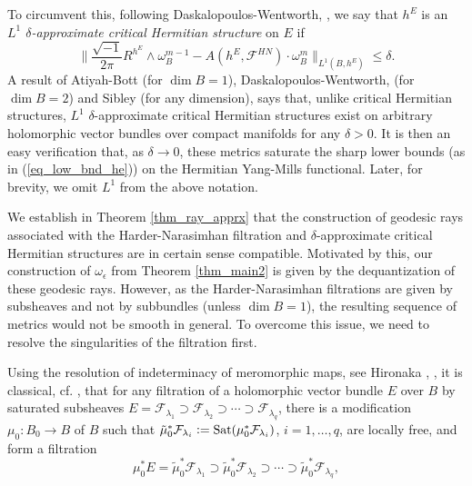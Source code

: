 \documentclass[12pt]{article}
\numberwithin{equation}{section}
\theoremstyle{theorem}
\theoremstyle{definition}
\theoremstyle{remark}
\newcommand{\imun} {\sqrt{-1}}
\begin{document}
	\begin{sloppypar}
	To circumvent this, following Daskalopoulos-Wentworth, \cite{DaskWent}, we say that $h^E$ is an \textit{$L^1$ $\delta$-approximate critical Hermitian structure} on $E$ if
	\begin{equation}\label{eq_appr_crhs}
		\Big\|
			\frac{\imun}{2 \pi} R^{h^E} \wedge \omega_B^{m - 1}
			-
			A(h^E, \mathcal{F}^{HN}) \cdot \omega_B^m
		\Big\|_{L^1(B, h^E)}
		\leq
		\delta.
	\end{equation}
	A result of Atiyah-Bott \cite[proof of Proposition 8.20]{AtiyahBott} (for $\dim B = 1$), Daskalopoulos-Wentworth, \cite[Theorem 3.11]{DaskWent} (for $\dim B = 2$) and Sibley \cite[Theorem 1.3]{SibleyYangMills} (for any dimension), says that, unlike critical Hermitian structures, $L^1$ $\delta$-approximate critical Hermitian structures exist on arbitrary holomorphic vector bundles over compact manifolds for any $\delta > 0$.
	It is then an easy verification that, as $\delta \to 0$, these metrics saturate the sharp lower bounds (as in (\ref{eq_low_bnd_he})) on the Hermitian Yang-Mills functional.
	Later, for brevity, we omit $L^1$ from the above notation.
	\end{sloppypar}
	\par 
	We establish in Theorem \ref{thm_ray_apprx} that the construction of geodesic rays associated with the Harder-Narasimhan filtration and $\delta$-approximate critical Hermitian structures are in certain sense compatible. 
	Motivated by this, our construction of $\omega_{\epsilon}$ from Theorem \ref{thm_main2} is given by the dequantization of these geodesic rays.
	However, as the Harder-Narasimhan filtrations are given by subsheaves and not by subbundles (unless $\dim B = 1$), the resulting sequence of metrics would not be smooth in general. 
	To overcome this issue, we need to resolve the singularities of the filtration first.
	\par 
	Using the resolution of indeterminacy of meromorphic maps, see Hironaka \cite{HironakaI}, \cite{HironakaII}, it is classical, cf. \cite[Proposition 4.3]{SibleyYangMills}, that for any filtration of a holomorphic vector bundle $E$ over $B$ by saturated subsheaves $E = \mathcal{F}_{\lambda_1} \supset \mathcal{F}_{\lambda_2} \supset \cdots \supset \mathcal{F}_{\lambda_q}$, there is a modification $\mu_0 : B_0 \to B$ of $B$ such that $\tilde{\mu}_0^* \mathcal{F}_{\lambda_i} := {\rm{Sat}}(\mu_0^* \mathcal{F}_{\lambda_i})$, $i = 1, \ldots, q$, are locally free, and form a filtration
	\begin{equation}\label{eq_resol_filtr}
		\mu_0^* E = \tilde{\mu}_0^* \mathcal{F}_{\lambda_1} \supset \tilde{\mu}_0^* \mathcal{F}_{\lambda_2} \supset \cdots \supset \tilde{\mu}_0^* \mathcal{F}_{\lambda_q},
	\end{equation}
\end{document}
